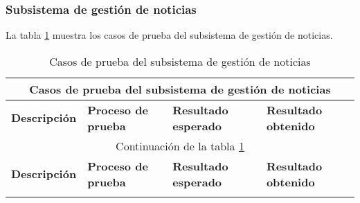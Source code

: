 \begin{landscape}
	 \subsubsection{Subsistema de gestión de noticias}
	 	La tabla \ref{table:casos_prueba_noticias} muestra los casos de prueba del subsistema de gestión de noticias.
	 	
	 	\begin{longtable}[c]{|p{50mm}|p{50mm}|p{50mm}|p{50mm}|}
	 	 \caption{Casos de prueba del subsistema de gestión de noticias\label{table:casos_prueba_noticias}}\\
	 	
	 	 \hline
	 	 \multicolumn{4}{|c|}{\textbf{Casos de prueba del subsistema de gestión de noticias}}\\
	 	 \hline
	 	 \textbf{Descripción} & \textbf{Proceso de prueba} & \textbf{Resultado esperado} & \textbf{Resultado obtenido}\\
	 	 \hline
	 	 \hline
	 	 \endfirsthead
	 	 
	 	 \hline
	 	 \multicolumn{4}{|c|}{Continuación de la tabla \ref{table:casos_prueba_noticias}}\\
	 	 \hline
	 	 \textbf{Descripción} & \textbf{Proceso de prueba} & \textbf{Resultado esperado} & \textbf{Resultado obtenido}\\
	 	 \hline
	 	 \hline
	 	 \endhead
	 	 
	 	 \hline
	 	 \endfoot
	 	 

\end{longtable}
\end{landscape}
